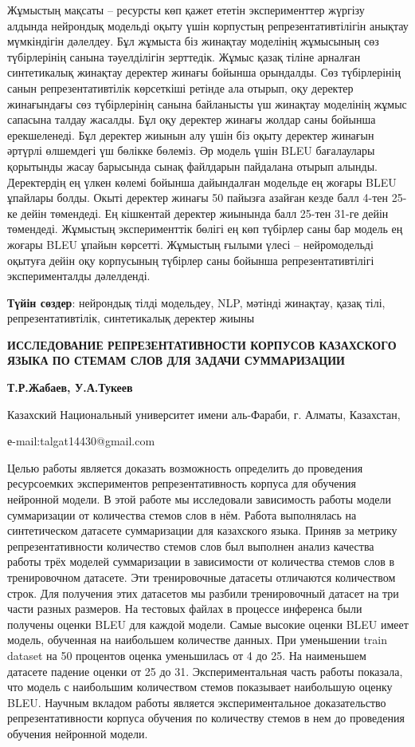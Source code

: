 Жұмыстың мақсаты -- ресурсты көп қажет ететін эксперименттер жүргізу
алдында нейрондық модельді оқыту үшін корпустың репрезентативтілігін
анықтау мүмкіндігін дәлелдеу. Бұл жұмыста біз жинақтау моделінің
жұмысының сөз түбірлерінің санына тәуелділігін зерттедік. Жұмыс қазақ
тіліне арналған синтетикалық жинақтау деректер жинағы бойынша орындалды.
Сөз түбірлерінің санын репрезентативтілік көрсеткіші ретінде ала отырып,
оқу деректер жинағындағы сөз түбірлерінің санына байланысты үш жинақтау
моделінің жұмыс сапасына талдау жасалды. Бұл оқу деректер жинағы жолдар
саны бойынша ерекшеленеді. Бұл деректер жиынын алу үшін біз оқыту
деректер жинағын әртүрлі өлшемдегі үш бөлікке бөлеміз. Әр модель үшін
BLEU бағалаулары қорытынды жасау барысында сынақ файлдарын пайдалана
отырып алынды. Деректердің ең үлкен көлемі бойынша дайындалған модельде
ең жоғары BLEU ұпайлары болды. Окыті деректер жинағы 50 пайызға азайған
кезде балл 4-тен 25-ке дейін төмендеді. Ең кішкентай деректер жиынында
балл 25-тен 31-ге дейін төмендеді. Жұмыстың эксперименттік бөлігі ең көп
түбірлер саны бар модель ең жоғары BLEU ұпайын көрсетті. Жұмыстың ғылыми
үлесі -- нейромодельді оқытуға дейін оқу корпусының түбірлер саны
бойынша репрезентативтілігі эксперименталды дәлелденді.

{\bfseries Түйін сөздер}: нейрондық тілді модельдеу, NLP, мәтінді жинақтау,
қазақ тілі, репрезентативтілік, синтетикалық деректер жиыны
\newpage
\begin{center}
{\large\bfseries ИССЛЕДОВАНИЕ РЕПРЕЗЕНТАТИВНОСТИ КОРПУСОВ КАЗАХСКОГО ЯЗЫКА ПО СТЕМАМ СЛОВ ДЛЯ ЗАДАЧИ СУММАРИЗАЦИИ}

{\bfseries Т.Р.Жабаев\envelope, У.А.Тукеев}

Казахский Национальный университет имени аль-Фараби, г. Алматы,
Казахстан,

е-mail:talgat14430@gmail.com
\end{center}

Целью работы является доказать возможность определить до проведения
ресурсоемких экспериментов репрезентативность корпуса для обучения
нейронной модели. В этой работе мы исследовали зависимость работы модели
суммаризации от количества стемов слов в нём. Работа выполнялась на
синтетическом датасете суммаризации для казахского языка. Приняв за
метрику репрезентативности количество стемов слов был выполнен анализ
качества работы трёх моделей суммаризации в зависимости от количества
стемов слов в тренировочном датасете. Эти тренировочные датасеты
отличаются количеством строк. Для получения этих датасетов мы разбили
тренировочный датасет на три части разных размеров. На тестовых файлах в
процессе инференса были получены оценки BLEU для каждой модели. Самые
высокие оценки BLEU имеет модель, обученная на наибольшем количестве
данных. При уменьшении train dataset на 50 процентов оценка уменьшилась
от 4 до 25. На наименьшем датасете падение оценки от 25 до 31.
Экспериментальная часть работы показала, что модель с наибольшим
количеством стемов показывает наибольшую оценку BLEU. Научным вкладом
работы является экспериментальное доказательство репрезентативности
корпуса обучения по количеству стемов в нем до проведения обучения
нейронной модели.

